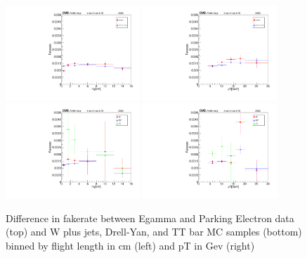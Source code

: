 \begin{figure}[!h]
  \begin{center}
    \includegraphics[width=0.45\textwidth]{figures/chapter4/fakerate/playV0-ks_kin_lxy_muidbdt40_EGamma_v_Parking_overlay.pdf}
    \includegraphics[width=0.45\textwidth]{figures/chapter4/fakerate/playV0-ks_kin_pT_muidbdt40_EGamma_v_Parking_overlay.pdf} \\
    \includegraphics[width=0.45\textwidth]{figures/chapter4/fakerate/playV0-ks_kin_lxy_muidbdt40_W_v_DY_v_TT_overlay.pdf}
    \includegraphics[width=0.45\textwidth]{figures/chapter4/fakerate/playV0-ks_kin_pT_muidbdt40_W_v_DY_v_TT_overlay.pdf}
  \end{center}
  \caption{Difference in fakerate between Egamma and Parking Electron data (top) and W plus jets, Drell-Yan, and TT bar MC samples (bottom) binned by flight length in cm (left) and pT in Gev (right)}
  \label{fig:pion_fake_rate_systematics}
\end{figure}

